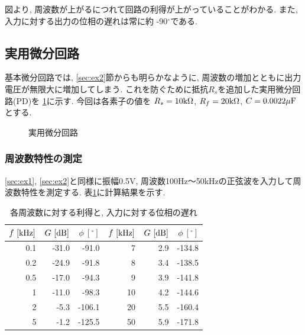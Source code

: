 \documentclass[titlepage]{jsarticle}
\begin{document}
            図より, 周波数が上がるにつれて回路の利得が上がっていることがわかる.
            また, 入力に対する出力の位相の遅れは常に約 -90$^\circ$である.

    \subsection{実用微分回路}
        基本微分回路では, \ref{sec:ex2}節からも明らかなように,
        周波数の増加とともに出力電圧が無限大に増加してしまう.
        これを防ぐために抵抗$R_s$を追加した実用微分回路(PD)を
        \ref{fig:nice-dif}に示す.
        今回は各素子の値を
        $R_s = 10\rm{k\Omega}$, $R_f = 20\rm{k\Omega}$, $C = 0.0022\rm{\mu F}$とする.

        \begin{figure}[h]
            \centering
            \caption{実用微分回路}
            \label{fig:nice-dif}
        \end{figure}

        \subsubsection{周波数特性の測定} \label{sec:ex3}
            \ref{sec:ex1}, \ref{sec:ex2}と同様に振幅0.5V,
            周波数100Hz〜50kHzの正弦波を入力して周波数特性を測定する.
            表\ref{tab:nice-dif}に計算結果を示す.

            \begin{table}[h]
                \caption{各周波数に対する利得と, 入力に対する位相の遅れ}
                \label{tab:nice-dif}
                \centering
                \begin{tabular}{r|rr||r|rr}
                    $f \ [\rm{kHz}]$ & $G \ [\rm{dB}]$ & $\phi \ [^\circ]$ & $f \ [\rm{kHz}]$ & $G \ [\rm{dB}]$ & $\phi \ [^\circ]$ \\ \hline \hline
                    0.1 & -31.0 & -91.0 & 7 & 2.9 & -134.8 \\
                    0.2 & -24.9 & -91.8 & 8 & 3.4 & -138.5 \\
                    0.5 & -17.0 & -94.3 & 9 & 3.9 & -141.8 \\
                    1 & -11.0 & -98.3 & 10 & 4.2 & -144.6 \\
                    2 & -5.3 & -106.1 & 20 & 5.5 & -160.4 \\
                    5 & -1.2 & -125.5 & 50 & 5.9 & -171.8 \\
                \end{tabular}
            \end{table}
\end{document}
